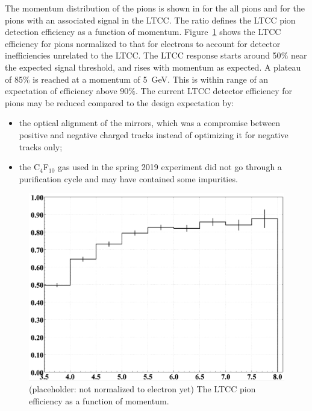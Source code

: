 The momentum distribution of the pions is shown in  for the all pions and for the pions
with an associated signal in the LTCC. The ratio defines the LTCC pion detection efficiency as a function of
momentum. Figure~\ref{fig:pionEfficiency} shows the LTCC efficiency for pions normalized to that for electrons
to account for detector inefficiencies unrelated to the LTCC. The LTCC response starts around 50$\%$ near
the expected signal threshold, and rises with momentum as expected. A plateau of 85$\%$ is reached at a
momentum of 5~GeV. This is within range of an expectation of efficiency above 90$\%$. The current LTCC
detector efficiency for pions may be reduced compared to the design expectation by:

\begin{itemize}
   \item the optical alignment of the mirrors, which was a compromise between
	      positive and negative charged tracks instead of optimizing it for negative tracks only;
    \item the  C$_4$F$_{10}$ gas used in the spring 2019 experiment did not go through a purification cycle and
			  may have contained some impurities.
\end{itemize}

\begin{figure}
	\centering
	\includegraphics[width=0.98\columnwidth,keepaspectratio]{img/pionEfficiency.png}
	\caption{(placeholder: not normalized to electron yet) The LTCC pion efficiency as a function of momentum.}
	\label{fig:pionEfficiency}
\end{figure}
